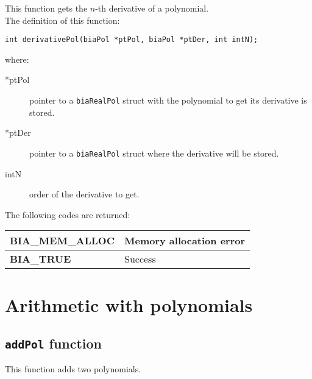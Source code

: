 This function gets the $n$-th derivative of a polynomial.\\

The definition of this function:
%
\begin{verbatim}
int derivativePol(biaPol *ptPol, biaPol *ptDer, int intN);
\end{verbatim}
%
where:
\begin{description} 
\item[*ptPol] pointer to a \texttt{biaRealPol} struct with the polynomial to get its derivative is stored.
\item[*ptDer] pointer to a \texttt{biaRealPol} struct where the derivative will be stored.
\item[intN] order of the derivative to get.
\end{description}
%
The following codes are returned:
%
\begin{center}
\begin{tabular}{|l|l|}
\hline
\textbf{BIA\_MEM\_ALLOC} & Memory allocation error \\
\hline
\textbf{BIA\_TRUE} & Success \\
\hline
\end{tabular}
\end{center}
%
%

\section{Arithmetic with polynomials}

\subsection{\texttt{addPol} function}

This function adds two polynomials.\\


